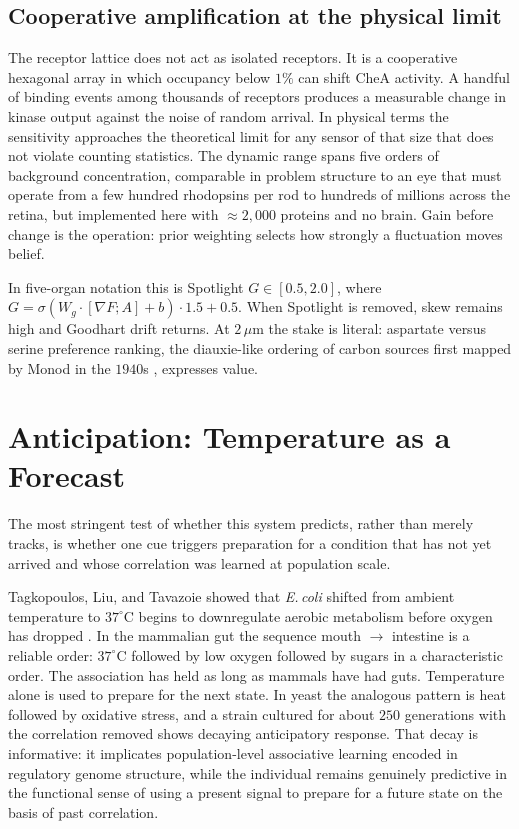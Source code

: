 \documentclass[12pt,a4paper]{article}
\begin{document}
\subsection{Cooperative amplification at the physical limit}

The receptor lattice does not act as isolated receptors. It is a cooperative hexagonal array in which occupancy below $1\%$ can shift CheA activity. A handful of binding events among thousands of receptors produces a measurable change in kinase output against the noise of random arrival. In physical terms the sensitivity approaches the theoretical limit for any sensor of that size that does not violate counting statistics. The dynamic range spans five orders of background concentration, comparable in problem structure to an eye that must operate from a few hundred rhodopsins per rod to hundreds of millions across the retina, but implemented here with $\approx 2{,}000$ proteins and no brain. Gain before change is the operation: prior weighting selects how strongly a fluctuation moves belief.

In five-organ notation this is Spotlight $G \in [0.5,2.0]$, where $G = \sigma(W_g \cdot [\nabla F; A] + b)\cdot 1.5 + 0.5$. When Spotlight is removed, skew remains high and Goodhart drift returns. At $2\,\mu\mathrm{m}$ the stake is literal: aspartate versus serine preference ranking, the diauxie-like ordering of carbon sources first mapped by Monod in the $1940$s \cite{monod1942}, expresses value.

\section{Anticipation: Temperature as a Forecast}
\label{sec:anticipation}

The most stringent test of whether this system predicts, rather than merely tracks, is whether one cue triggers preparation for a condition that has not yet arrived and whose correlation was learned at population scale.

Tagkopoulos, Liu, and Tavazoie showed that \emph{E.\,coli} shifted from ambient temperature to $37^\circ\mathrm{C}$ begins to downregulate aerobic metabolism before oxygen has dropped \cite{tagkopoulos2008}. In the mammalian gut the sequence mouth $\to$ intestine is a reliable order: $37^\circ\mathrm{C}$ followed by low oxygen followed by sugars in a characteristic order. The association has held as long as mammals have had guts. Temperature alone is used to prepare for the next state. In yeast the analogous pattern is heat followed by oxidative stress, and a strain cultured for about $250$ generations with the correlation removed shows decaying anticipatory response. That decay is informative: it implicates population-level associative learning encoded in regulatory genome structure, while the individual remains genuinely predictive in the functional sense of using a present signal to prepare for a future state on the basis of past correlation.
\end{document}
